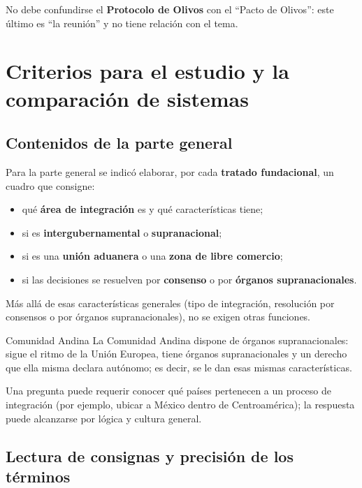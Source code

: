 \documentclass[12pt,oneside]{book}
\begin{document}
\begin{important}
No debe confundirse el \textbf{Protocolo de Olivos} con el ``Pacto de Olivos'': este último es ``la reunión'' y no tiene relación con el tema.
\end{important}

\chapter[Criterios de estudio y comparación]{Criterios para el estudio y la comparación de sistemas}

\section{Contenidos de la parte general}

Para la parte general se indicó elaborar, por cada \textbf{tratado fundacional}, un cuadro que consigne:

\begin{itemize}
    \item qué \textbf{área de integración} es y qué características tiene;
    \item si es \textbf{intergubernamental} o \textbf{supranacional};
    \item si es una \textbf{unión aduanera} o una \textbf{zona de libre comercio};
    \item si las decisiones se resuelven por \textbf{consenso} o por \textbf{órganos supranacionales}.
\end{itemize}

Más allá de esas características generales (tipo de integración, resolución por consensos o por órganos supranacionales), no se exigen otras funciones.

\begin{example}{Comunidad Andina}
La Comunidad Andina dispone de órganos supranacionales: sigue el ritmo de la Unión Europea, tiene órganos supranacionales y un derecho que ella misma declara autónomo; es decir, se le dan esas mismas características.
\end{example}

Una pregunta puede requerir conocer qué países pertenecen a un proceso de integración (por ejemplo, ubicar a México dentro de Centroamérica); la respuesta puede alcanzarse por lógica y cultura general.

\section{Lectura de consignas y precisión de los términos}
\end{document}
